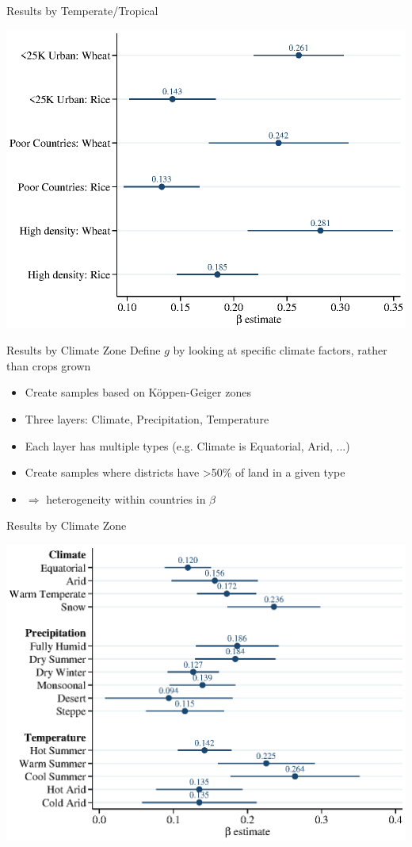 \documentclass[10pt, xcolor=dvipsnames]{beamer}
\begin{document}
\begin{frame}{Results by Temperate/Tropical}
\begin{center}
\includegraphics[width=.8\textwidth]{fig_coef_crop_sub_base.eps}
\end{center}
\end{frame}

\begin{frame}{Results by Climate Zone}
Define $g$ by looking at specific climate factors, rather than crops grown
\begin{itemize}
  \item Create samples based on K{\"o}ppen-Geiger zones
  \item Three layers: Climate, Precipitation, Temperature
  \item Each layer has multiple types (e.g. Climate is Equatorial, Arid, ...)
  \item Create samples where districts have >50\% of land in a given type
  \item $\Rightarrow$ heterogeneity within countries in $\beta$  
\end{itemize}
\end{frame}

\begin{frame}{Results by Climate Zone}\label{climate}
\begin{center}
\includegraphics[width=.8\textwidth]{fig_coef_kg_base.eps}
\end{center}
\hfill \hyperlink{climatereg}{}
\end{frame}
\end{document}
